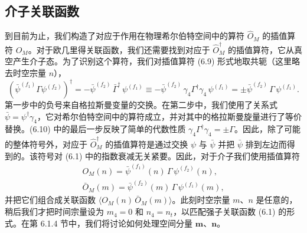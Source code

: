 \subsection{介子关联函数}

到目前为止，我们构造了对应于作用在物理希尔伯特空间中的算符 $\hat{O}_M$ 的插值算符 $O_M$。对于欧几里得关联函数，我们还需要找到对应于 $\hat{O}_M^\dagger$ 的插值算符，它从真空产生介子态。为了识别这个算符，我们对插值算符 (6.9) 形式地取共轭（这里略去时空宗量 $n$），
\begin{equation}
  \left( \bar\psi^{(f_1)} \Gamma \psi^{(f_2)} \right)^\dagger
  = -\bar\psi^{(f_2)}\, \bar{\Gamma}^\dagger\, \psi^{(f_1)}
  \equiv -\bar\psi^{(f_2)}\, \gamma_4 \Gamma^\dagger \gamma_4\, \psi^{(f_1)}
  = \pm \bar\psi^{(f_2)}\, \Gamma\, \psi^{(f_1)} .
\end{equation}
第一步中的负号来自格拉斯曼变量的交换。在第二步中，我们使用了关系式 $\bar\psi = \psi^\dagger\gamma_4$，它对希尔伯特空间中的算符成立，并对其中的格拉斯曼旋量进行了等价替换。(6.10) 中的最后一步反映了简单的代数性质 $\gamma_4\Gamma^\dagger\gamma_4 = \pm\Gamma$。因此，除了可能的整体符号外，对应于 $\hat{O}_M^\dagger$ 的插值算符是通过交换 $\psi$ 与 $\bar\psi$ 并把 $\bar\psi$ 排到左边而得到的。该符号对 (6.1) 中的指数衰减无关紧要。因此，对于介子我们使用插值算符
\begin{equation}
  \begin{gathered}
    O_M(n) = \bar\psi^{(f_1)}(n)\, \Gamma\, \psi^{(f_2)}(n) , \\
    \bar{O}_M(m) = \bar\psi^{(f_2)}(m)\, \Gamma\, \psi^{(f_1)}(m) ,
  \end{gathered}
\end{equation}
并把它们组合成关联函数 $\big\langle O_M(n)\, \bar{O}_M(m)\big\rangle$。此刻时空宗量 $m$、$n$ 是任意的，稍后我们才把时间宗量设为 $m_4 = 0$ 和 $n_4 = n_t$，以匹配强子关联函数 (6.1) 的形式。在第 6.1.4 节中，我们将讨论如何处理空间分量 $\mathbf{m}$、$\mathbf{n}$。


